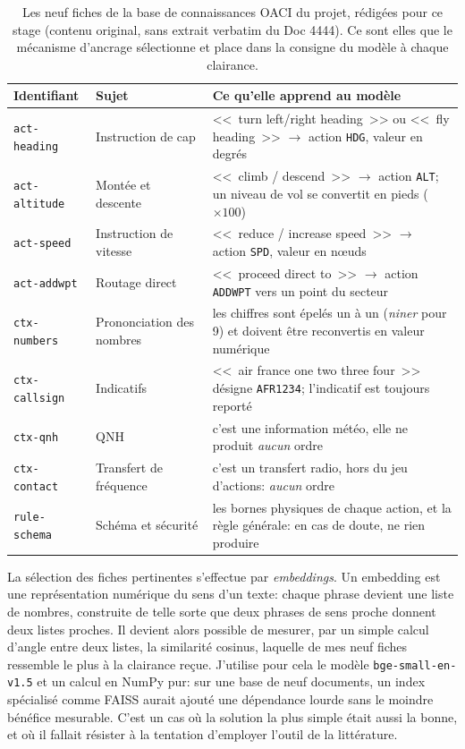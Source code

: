 \documentclass[11pt,a4paper]{article}
\begin{document}
\begin{table}[!htbp]
\centering
\caption[Les neuf fiches de la base de connaissances OACI du projet]{Les neuf fiches de la base de connaissances OACI du projet, rédigées pour ce stage
(contenu original, sans extrait verbatim du Doc 4444). Ce sont elles que le mécanisme
d'ancrage sélectionne et place dans la consigne du modèle à chaque clairance.}
\label{tab:fiches}
\small
\begin{tabular}{>{\raggedright\arraybackslash}p{2.6cm} >{\raggedright\arraybackslash}p{5.2cm} >{\raggedright\arraybackslash}p{7.2cm}}
\toprule
\rowcolor{lightgray}\textbf{Identifiant} & \textbf{Sujet} & \textbf{Ce qu'elle apprend au modèle}\\
\midrule
\texttt{act-heading} & Instruction de cap & <<~turn left/right heading~>> ou <<~fly heading~>> $\rightarrow$ action \texttt{HDG}, valeur en degrés\\
\texttt{act-altitude} & Montée et descente & <<~climb / descend~>> $\rightarrow$ action \texttt{ALT}; un niveau de vol se convertit en pieds ($\times 100$)\\
\texttt{act-speed} & Instruction de vitesse & <<~reduce / increase speed~>> $\rightarrow$ action \texttt{SPD}, valeur en n\oe uds\\
\texttt{act-addwpt} & Routage direct & <<~proceed direct to~>> $\rightarrow$ action \texttt{ADDWPT} vers un point du secteur\\
\texttt{ctx-numbers} & Prononciation des nombres & les chiffres sont épelés un à un (\emph{niner} pour 9) et doivent être reconvertis en valeur numérique\\
\texttt{ctx-callsign} & Indicatifs & <<~air france one two three four~>> désigne \texttt{AFR1234}; l'indicatif est toujours reporté\\
\texttt{ctx-qnh} & QNH & c'est une information météo, elle ne produit \emph{aucun} ordre\\
\texttt{ctx-contact} & Transfert de fréquence & c'est un transfert radio, hors du jeu d'actions: \emph{aucun} ordre\\
\texttt{rule-schema} & Schéma et sécurité & les bornes physiques de chaque action, et la règle générale: en cas de doute, ne rien produire\\
\bottomrule
\end{tabular}
\end{table}

La sélection des fiches pertinentes s'effectue par \emph{embeddings}. Un embedding est une représentation numérique du sens d'un texte: chaque phrase devient une liste de nombres, construite de telle sorte que deux phrases de sens proche donnent deux listes proches. Il devient alors possible de mesurer, par un simple calcul d'angle entre deux listes, la similarité cosinus, laquelle de mes neuf fiches ressemble le plus à la clairance reçue. J'utilise pour cela le modèle \texttt{bge-small-en-v1.5} et un calcul en NumPy pur: sur une base de neuf documents, un index spécialisé comme FAISS aurait ajouté une dépendance lourde sans le moindre bénéfice mesurable. C'est un cas où la solution la plus simple était aussi la bonne, et où il fallait résister à la tentation d'employer l'outil de la littérature. 
\end{document}
